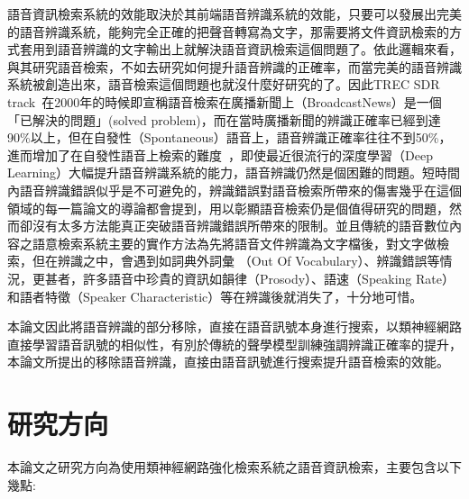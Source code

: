 語音資訊檢索系統的效能取決於其前端語音辨識系統的效能，只要可以發展出完美的語音辨識系統，能夠完全正確的把聲音轉寫為文字，那需要將文件資訊檢索的方式套用到語音辨識的文字輸出上就解決語音資訊檢索這個問題了。依此邏輯來看，與其研究語音檢索，不如去研究如何提升語音辨識的正確率，而當完美的語音辨識系統被創造出來，語音檢索這個問題也就沒什麼好研究的了。因此TREC SDR track~\cite{trec}在2000年的時候即宣稱語音檢索在廣播新聞上（BroadcastNews）是一個「已解決的問題」(solved
problem)，而在當時廣播新聞的辨識正確率已經到達90\%以上，但在自發性（Spontaneous）語音上，語音辨識正確率往往不到50\%，進而增加了在自發性語音上檢索的難度~\cite{saraclar2004lattice,mamou2006spoken}，即使最近很流行的深度學習（Deep
Learning）大幅提升語音辨識系統的能力，語音辨識仍然是個困難的問題。短時間內語音辨識錯誤似乎是不可避免的，辨識錯誤對語音檢索所帶來的傷害幾乎在這個領域的每一篇論文的導論都會提到，用以彰顯語音檢索仍是個值得研究的問題，然而卻沒有太多方法能真正突破語音辨識錯誤所帶來的限制。並且傳統的語音數位內容之語意檢索系統主要的實作方法為先將語音文件辨識為文字檔後，對文字做檢索，但在辨識之中，會遇到如詞典外詞彙
（Out Of Vocabulary）、辨識錯誤等情況，更甚者，許多語音中珍貴的資訊如韻律（Prosody）、語速（Speaking Rate）和語者特徵（Speaker Characteristic）等在辨識後就消失了，十分地可惜。

本論文因此將語音辨識的部分移除，直接在語音訊號本身進行搜索，以類神經網路直接學習語音訊號的相似性，有別於傳統的聲學模型訓練強調辨識正確率的提升，本論文所提出的移除語音辨識，直接由語音訊號進行搜索提升語音檢索的效能。

\section{研究方向}
本論文之研究方向為使用類神經網路強化檢索系統之語音資訊檢索，主要包含以下幾點:

